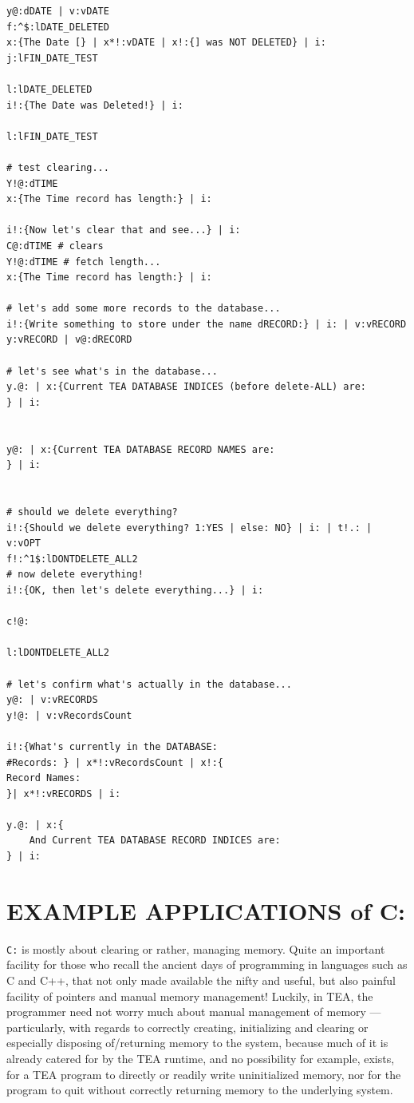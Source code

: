 \documentclass[a4paper, 18pt]{book} %
\begin{document}
\begin{tcolorbox}[teaterminalstyle, title=C: TEA DATABASE management TEST suite, breakable]
\begin{lstlisting}[language=TEA,breaklines=true,]
y@:dDATE | v:vDATE 
f:^$:lDATE_DELETED
x:{The Date [} | x*!:vDATE | x!:{] was NOT DELETED} | i:
j:lFIN_DATE_TEST

l:lDATE_DELETED
i!:{The Date was Deleted!} | i:

l:lFIN_DATE_TEST

# test clearing...
Y!@:dTIME
x:{The Time record has length:} | i:

i!:{Now let's clear that and see...} | i:
C@:dTIME # clears
Y!@:dTIME # fetch length...
x:{The Time record has length:} | i:

# let's add some more records to the database...
i!:{Write something to store under the name dRECORD:} | i: | v:vRECORD
y:vRECORD | v@:dRECORD

# let's see what's in the database...
y.@: | x:{Current TEA DATABASE INDICES (before delete-ALL) are:
} | i:


y@: | x:{Current TEA DATABASE RECORD NAMES are:
} | i:


# should we delete everything?
i!:{Should we delete everything? 1:YES | else: NO} | i: | t!.: | v:vOPT
f!:^1$:lDONTDELETE_ALL2
# now delete everything!
i!:{OK, then let's delete everything...} | i:

c!@:

l:lDONTDELETE_ALL2

# let's confirm what's actually in the database...
y@: | v:vRECORDS
y!@: | v:vRecordsCount

i!:{What's currently in the DATABASE:
#Records: } | x*!:vRecordsCount | x!:{
Record Names:
}| x*!:vRECORDS | i:

y.@: | x:{
    And Current TEA DATABASE RECORD INDICES are:
} | i:
   \end{lstlisting}
  \end{tcolorbox}

\vspace{2em}




\section{EXAMPLE APPLICATIONS of C:}
\label{SECEXAMPC}

\texttt{C:} is mostly about clearing or rather, managing memory. Quite an important facility for those who recall the ancient days of programming in languages such as C and C++, that not only made available the nifty and useful, but also painful facility of pointers and manual memory management! Luckily, in TEA, the programmer need not worry much about manual management of memory --- particularly, with regards to correctly creating, initializing and clearing or especially disposing of/returning memory to the system, because much of it is already catered for by the TEA runtime, and no possibility for example, exists, for a TEA program to directly or readily write uninitialized memory, nor for the program to quit without correctly returning memory to the underlying system.
\end{document}
